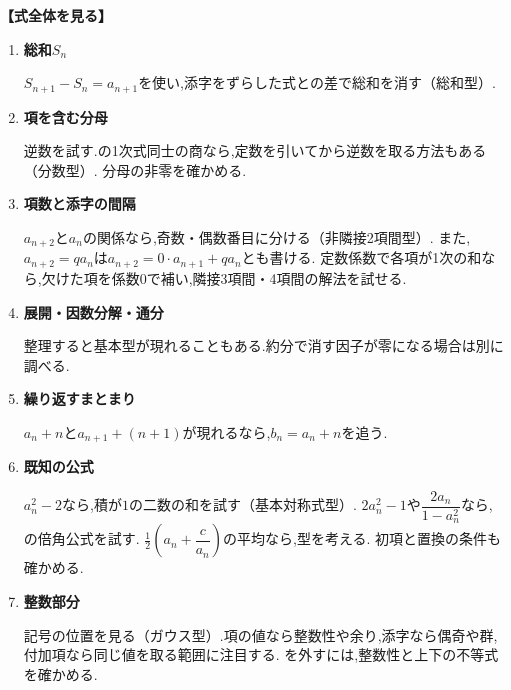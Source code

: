   \begingroup
  \medskip
  \noindent \textbf{【式全体を見る】}
  \begin{enumerate}
    \item \textbf{総和$S_n$}

      $S_{n+1}-S_n=a_{n+1}$を使い,添字をずらした式との差で総和を消す（総和型）.

    \item \textbf{項を含む分母}

      逆数を試す.の1次式同士の商なら,定数を引いてから逆数を取る方法もある（分数型）.
      分母の非零を確かめる.

    \item \textbf{項数と添字の間隔}

      $a_{n+2}$と$a_n$の関係なら,奇数・偶数番目に分ける（非隣接2項間型）.
      また,$a_{n+2}=qa_n$は$a_{n+2}=0\cdot a_{n+1}+qa_n$とも書ける.
      定数係数で各項が1次の和なら,欠けた項を係数$0$で補い,隣接3項間・4項間の解法を試せる.

    \item \textbf{展開・因数分解・通分}

      整理すると基本型が現れることもある.約分で消す因子が零になる場合は別に調べる.

    \item \textbf{繰り返すまとまり}

      $a_n+n$と$a_{n+1}+(n+1)$が現れるなら,$b_n=a_n+n$を追う.

    \item \textbf{既知の公式}

      $a_n^2-2$なら,積が$1$の二数の和を試す（基本対称式型）.
      $2a_n^2-1$や$\dfrac{2a_n}{1-a_n^2}$なら,の倍角公式を試す.
      $\frac12\left(a_n+\dfrac{c}{a_n}\right)$の平均なら,型を考える.
      初項と置換の条件も確かめる.


    \item \textbf{整数部分}

      記号の位置を見る（ガウス型）.項の値なら整数性や余り,添字なら偶奇や群,付加項なら同じ値を取る範囲に注目する.
      を外すには,整数性と上下の不等式を確かめる.
  \end{enumerate}

